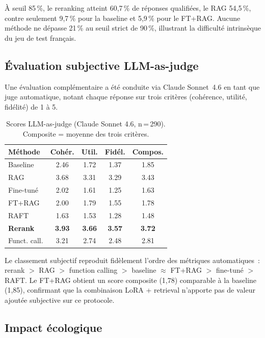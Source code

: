 \documentclass[10pt,journal,compsoc]{IEEEtran}
\newcommand{\best}[1]{\textbf{\textcolor{best}{#1}}}   %
\begin{document}
À seuil 85\,\%, le reranking atteint 60,7\,\% de réponses qualifiées,
le RAG 54,5\,\%, contre seulement 9,7\,\% pour la baseline et 5,9\,\%
pour le FT+RAG. Aucune méthode ne dépasse 21\,\% au seuil strict de
90\,\%, illustrant la difficulté intrinsèque du jeu de test français.

\subsection{Évaluation subjective LLM-as-judge}
\label{subsec:judge}

Une évaluation complémentaire a été conduite via Claude Sonnet~4.6 en
tant que juge automatique, notant chaque réponse sur trois critères
(cohérence, utilité, fidélité) de 1 à 5.

\begin{table}[h]
  \centering
  \caption{Scores LLM-as-judge (Claude Sonnet 4.6, n\,=\,290).
           Composite = moyenne des trois critères.}
  \label{tab:judge}
  \renewcommand{\arraystretch}{1.2}
  \begin{tabular}{lcccc}
    \toprule
    \textbf{Méthode} & \textbf{Cohér.} & \textbf{Util.}
      & \textbf{Fidél.} & \textbf{Compos.} \\
    \midrule
    Baseline       & 2.46 & 1.72 & 1.37 & 1.85 \\
    RAG            & 3.68 & 3.31 & 3.29 & 3.43 \\
    Fine-tuné      & 2.02 & 1.61 & 1.25 & 1.63 \\
    FT+RAG         & 2.00 & 1.79 & 1.55 & 1.78 \\
    RAFT           & 1.63 & 1.53 & 1.28 & 1.48 \\
    \textbf{Rerank}& \best{3.93} & \best{3.66} & \best{3.57} & \best{3.72} \\
    Funct. call.   & 3.21 & 2.74 & 2.48 & 2.81 \\
    \bottomrule
  \end{tabular}
\end{table}

Le classement subjectif reproduit fidèlement l'ordre des métriques
automatiques~: rerank $>$ RAG $>$ function calling $>$ baseline $\approx$
FT+RAG $>$ fine-tuné $>$ RAFT. Le FT+RAG obtient un score composite
(1,78) comparable à la baseline (1,85), confirmant que la combinaison
LoRA + retrieval n'apporte pas de valeur ajoutée subjective sur ce
protocole.

\subsection{Impact écologique}
\end{document}
